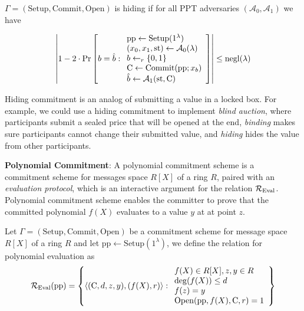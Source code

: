 \begin{definition}
\label{hiding-commitment}
$\Gamma = (\mathrm{Setup}, \mathrm{Commit}, \mathrm{Open})$ is \textup{hiding} if for all PPT adversaries $(\mathcal{A}_0, \mathcal{A}_1)$ we have

\begin{align*}
\left\vert
1 - 2 \cdot \mathrm{Pr} \left[  b = \hat{b} :
\begin{array}{l}
    \mathrm{pp} \gets \mathrm{Setup}(1^\lambda) \\
    (x_0, x_1, \mathrm{st}) \gets \mathcal{A}_0(\lambda) \\
    b \gets_r \{0, 1\} \\
    \mathrm{C} \gets \mathrm{Commit}(\mathrm{pp}; x_b) \\
    \hat{b} \gets \mathcal{A}_1(\mathrm{st}, \mathrm{C})
\end{array}
 \right]
\right\vert \le \mathrm{negl}(\lambda)
\end{align*}
\end{definition}

Hiding commitment is an analog of submitting a value in a locked box. For example, we could use a hiding commitment to implement \textit{blind auction}, where participants submit a sealed price that will be opened at the end, \textit{binding} makes sure participants cannot change their submitted value, and \textit{hiding} hides the value from other participants.

\textbf{Polynomial Commitment}: A polynomial commitment scheme is a commitment scheme for messages space $R[X]$ of a ring $R$, paired with an \textit{evaluation protocol}, which is an interactive argument for the relation $\mathcal{R}_{\mathrm{Eval}}$. Polynomial commitment scheme enables the committer to prove that the committed polynomial $f(X)$ evaluates to a value $y$ at at point $z$.

\begin{definition}
\label{r-eval}
Let $\Gamma = (\mathrm{Setup}, \mathrm{Commit}, \mathrm{Open})$ be a commitment scheme for message space $R[X]$ of a ring $R$ and let $\mathrm{pp} \gets \mathrm{Setup}(1^{\lambda})$, we define the relation for polynomial evaluation as
\begin{align*}
\mathcal{R}_{\mathrm{Eval}}(\mathrm{pp})
=
\left\{\langle (\mathrm{C}, d, z, y), (f(X), r) \rangle :
\begin{array}{l}
    f(X) \in R[X], z, y \in R \\
    \mathrm{deg}(f(X)) \le d \\
    f(z) = y \\
    \mathrm{Open}(\mathrm{pp}, f(X), \mathrm{C}, r) = 1
\end{array}
\right\}
\end{align*}
\end{definition}

